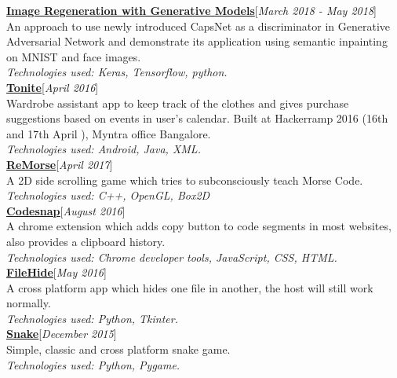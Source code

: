\documentclass[10pt]{article}
\begin{document}
\textbf{\underline{%
{Image Regeneration with Generative Models}}}\hfill[\textit{March 2018 - May 2018}]\\
An approach to use newly introduced CapsNet as a discriminator in Generative Adversarial Network and demonstrate its application using semantic inpainting on MNIST and face images.\\
\textit{Technologies used: Keras, Tensorflow, python.}
\smallskip
\\
\textbf{\underline{\large\href{https://github.com/abhijith0505/Tonite}
{Tonite}}}\hfill[\textit{April 2016}]\\
Wardrobe assistant app to keep track of the clothes and gives purchase
suggestions based on events in user's calendar. Built at Hackerramp
2016 (16th and 17th April ), Myntra office Bangalore.\\
\textit{Technologies used: Android, Java, XML.}
\smallskip
\\
\textbf{\underline{\large\href{https://github.com/RaghavaDhanya/ReMorse}
{ReMorse}}}\hfill[\textit{April 2017}]
\\
A 2D side scrolling game which tries to subconsciously teach Morse Code.\\
\textit{Technologies used: C++, OpenGL, Box2D}
\smallskip
\\
\textbf{\underline{\large\href{https://github.com/RaghavaDhanya/Codesnap}
{Codesnap}}}\hfill[\textit{August 2016}]
\\
A chrome extension which adds copy button to code segments in most
websites, also provides a clipboard history.\\
\textit{Technologies used: Chrome developer tools, JavaScript, CSS,
HTML. }
\smallskip
\\
\textbf{\underline{\large\href{https://github.com/RaghavaDhanya/FileHide}
{FileHide}}}\hfill[\textit{May 2016}]
\\
A cross platform app which hides one file in another, the host will
still work normally.\\
\textit{Technologies used: Python, Tkinter.}
\smallskip
\\
\textbf{\underline{\large\href{https://github.com/RaghavaDhanya/Snake}
{Snake}}}\hfill[\textit{December 2015}]
\\
Simple, classic and cross platform snake game.\\
\textit{Technologies used: Python, Pygame.} 

\end{document}
